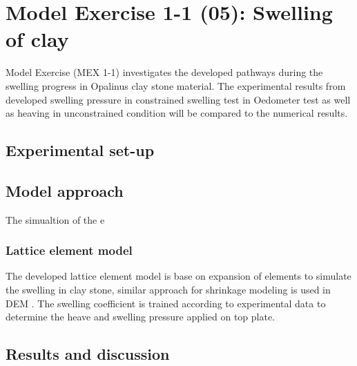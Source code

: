 \section{Model Exercise 1-1 (05): Swelling of clay}
\label{sec:mex05}
Model Exercise (MEX 1-1) investigates the developed pathways during the swelling progress in Opalinus clay stone material. The experimental results from developed swelling pressure in constrained swelling test in Oedometer test as well as heaving in unconstrained condition will be compared to the numerical results. 

\subsection{Experimental set-up}




\subsection{Model approach}

The simualtion of the e

\subsubsection*{Lattice element model}

The developed lattice element model is base on expansion of elements to simulate the swelling in clay stone, similar approach for shrinkage modeling is used in DEM \cite{Simaetal2013}. The swelling coefficient is trained according to experimental data to determine the heave and swelling pressure applied on top plate. 




\subsection{Results and discussion}